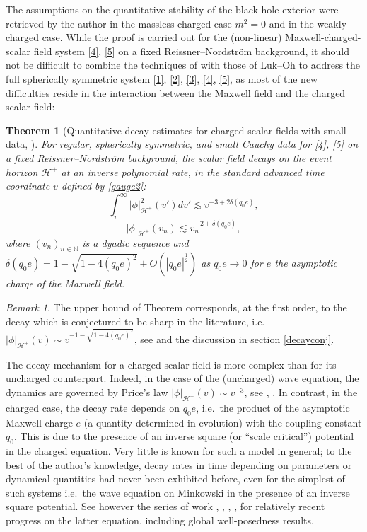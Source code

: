 \documentclass[10pt,a4paper]{article}
\theoremstyle{plain}
\newtheorem{thm}{Theorem}[section]
\theoremstyle{remark}
\newtheorem{rmk}{Remark}[section]
\theoremstyle{definition}
\theoremstyle{plain}
\theoremstyle{remark}
\theoremstyle{definition}
\numberwithin{equation}{section}
\begin{document}
The assumptions on the quantitative stability of the black hole exterior were retrieved by the author \cite{Moi2} in the massless charged case $m^2=0$ and in the weakly charged case. While the proof is carried out for the (non-linear) Maxwell-charged-scalar field system \eqref{4}, \eqref{5} on a fixed Reissner--Nordstr\"{o}m background, it should not be difficult to combine the techniques of \cite{Moi2} with those of Luk--Oh \cite{JonathanStabExt} to address \color{black} the full spherically symmetric system \eqref{1}, \eqref{2}, \eqref{3}, \eqref{4}, \eqref{5}, as most of the new difficulties reside in the interaction between the Maxwell field and the charged scalar field: \begin{thm}[Quantitative decay estimates for charged scalar fields with small data, \cite{Moi2}] \label{decaychargedext}
	For regular, spherically symmetric, and small Cauchy data for \eqref{4}, \eqref{5} on a fixed Reissner--Nordstr\"{o}m background, the scalar field decays on the event horizon $\mathcal{H}^+$ at an inverse polynomial rate, in the standard advanced time coordinate $v$ defined by \eqref{gauge2}: $$ \int_{v}^{\infty}|\phi|_{\mathcal{H}^+}^2(v') dv' \lesssim v^{-3+2\delta(q_0e)},$$
	$$ |\phi|_{\mathcal{H}^+}(v_n)  \lesssim v_n^{-2+\delta(q_0e)},$$ where $(v_n)_{n\in \mathbb{N}}$ is a dyadic sequence and  \color{black} $\delta(q_0e)=1-\sqrt{1-4(q_0e)^2}+O( |q_0e|^{\frac{1}{2}})$ as $q_0e \rightarrow 0$ for $e$ the asymptotic charge of the Maxwell field.
\end{thm} \begin{rmk}
The upper bound of Theorem \cite{Moi2} corresponds, at the first order, to the decay which is conjectured to be sharp in the literature, i.e.\ $|\phi|_{\mathcal{H}^+}(v) \sim  v^{-1-\sqrt{1-4(q_0e)^2}}$, see \cite{HodPiran1} and the discussion in section \ref{decayconj}.
\end{rmk}
The decay mechanism for a charged scalar field is more complex than for its uncharged counterpart. Indeed, in the case of the (uncharged) wave equation, the dynamics are governed by Price's law $|\phi|_{\mathcal{H}^+}(v) \sim  v^{-3}$, see \cite{PriceLaw}, \cite{Pricepaper}. In contrast, in the charged case, the decay rate depends on $q_0e$, i.e.\ the product of the asymptotic Maxwell charge $e$ (a quantity determined in evolution) with the coupling constant $q_0$. This is due to the presence of an inverse square (or ``scale critical'') potential in the charged equation.  Very little is known for such a model in general; to the best of the author's knowledge, decay rates in time depending on parameters or dynamical quantities had never been exhibited before, even for the simplest of such systems i.e.\ the wave equation on Minkowski in the presence of an inverse square potential. See however the series of work \cite{scalecrit1}, \cite{scalecrit2}, \cite{scalecrit2.5}, \cite{scalecrit3}, \cite{scalecrit4} for relatively recent progress on the latter equation, including global well-posedness results.
\end{document}
